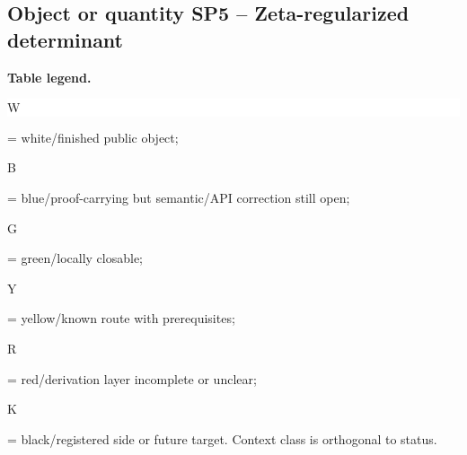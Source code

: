 \subsection*{Object or quantity SP5 -- Zeta-regularized determinant}
\hypertarget{objproof:SP5}{}
\par\smallskip\noindent\begin{minipage}{0.99\linewidth}\footnotesize\raggedright\textbf{Table legend.} \colorbox{white}{\strut W} = white/finished public object; \colorbox{cyan!20}{\strut B} = blue/proof-carrying but semantic/API correction still open; \colorbox{green!18}{\strut G} = green/locally closable; \colorbox{yellow!25}{\strut Y} = yellow/known route with prerequisites; \colorbox{red!20}{\strut R} = red/derivation layer incomplete or unclear; \colorbox{black!18}{\strut K} = black/registered side or future target. Context class is orthogonal to status.\end{minipage}\par\vspace{0.25em}
